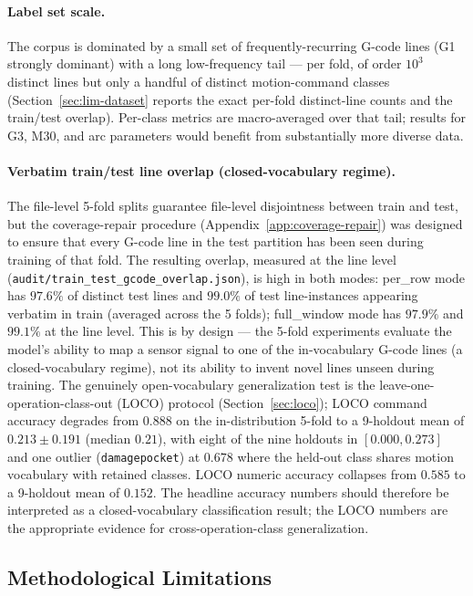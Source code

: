 \documentclass[sensors,article,submit,moreauthors,pdftex]{Definitions/mdpi}
\begin{document}
\paragraph{Label set scale.} The corpus is dominated by a small set of frequently-recurring G-code lines (G1 strongly dominant) with a long low-frequency tail --- per fold, of order $10^3$ distinct lines but only a handful of distinct motion-command classes (Section~\ref{sec:lim-dataset} reports the exact per-fold distinct-line counts and the train/test overlap). Per-class metrics are macro-averaged over that tail; results for G3, M30, and arc parameters would benefit from substantially more diverse data.

\paragraph{Verbatim train/test line overlap (closed-vocabulary regime).} The file-level 5-fold splits guarantee file-level disjointness between train and test, but the coverage-repair procedure (Appendix~\ref{app:coverage-repair}) was designed to ensure that every G-code line in the test partition has been seen during training of that fold. The resulting overlap, measured at the line level (\texttt{audit/train\_test\_gcode\_overlap.json}), is high in both modes: per\_row mode has $97.6\%$ of distinct test lines and $99.0\%$ of test line-instances appearing verbatim in train (averaged across the 5 folds); full\_window mode has $97.9\%$ and $99.1\%$ at the line level. This is by design --- the 5-fold experiments evaluate the model's ability to map a sensor signal to one of the in-vocabulary G-code lines (a closed-vocabulary regime), not its ability to invent novel lines unseen during training. The genuinely open-vocabulary generalization test is the leave-one-operation-class-out (LOCO) protocol (Section~\ref{sec:loco}); LOCO command accuracy degrades from $0.888$ on the in-distribution 5-fold to a 9-holdout mean of $0.213 \pm 0.191$ (median $0.21$), with eight of the nine holdouts in $[0.000, 0.273]$ and one outlier (\texttt{damagepocket}) at $0.678$ where the held-out class shares motion vocabulary with retained classes. LOCO numeric accuracy collapses from $0.585$ to a 9-holdout mean of $0.152$. The headline accuracy numbers should therefore be interpreted as a closed-vocabulary classification result; the LOCO numbers are the appropriate evidence for cross-operation-class generalization.

\subsection{Methodological Limitations}
\label{sec:lim-method}
\end{document}
